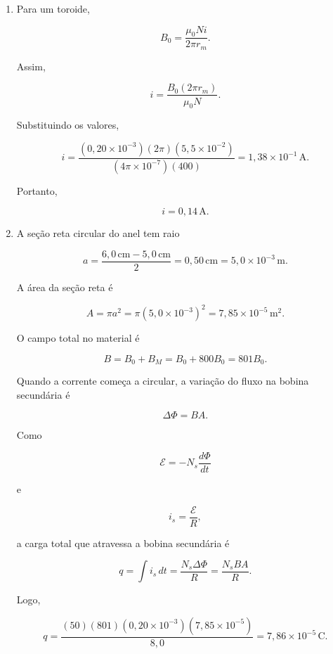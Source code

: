 \begin{enumerate}
    \item[(a)] Para um toroide,

    \[
    B_0=\frac{\mu_0Ni}{2\pi r_m}.
    \]

    Assim,

    \[
    i=\frac{B_0(2\pi r_m)}{\mu_0N}.
    \]

    Substituindo os valores,

    \[
    i=
    \frac{(0{,}20\times 10^{-3})(2\pi)(5{,}5\times 10^{-2})}
    {(4\pi\times 10^{-7})(400)}
    =
    1{,}38\times 10^{-1}\,\text{A}.
    \]

    Portanto,

    \[
    i=0{,}14\,\text{A}.
    \]

    \item[(b)] A seção reta circular do anel tem raio

    \[
    a=\frac{6{,}0\,\text{cm}-5{,}0\,\text{cm}}{2}
    =0{,}50\,\text{cm}
    =5{,}0\times 10^{-3}\,\text{m}.
    \]

    A área da seção reta é

    \[
    A=\pi a^2
    =\pi(5{,}0\times 10^{-3})^2
    =7{,}85\times 10^{-5}\,\text{m}^2.
    \]

    O campo total no material é

    \[
    B=B_0+B_M=B_0+800B_0=801B_0.
    \]

    Quando a corrente começa a circular, a variação do fluxo na bobina
    secundária é

    \[
    \Delta \Phi=B A.
    \]

    Como

    \[
    \mathcal{E}=-N_s\frac{d\Phi}{dt}
    \]

    e

    \[
    i_s=\frac{\mathcal{E}}{R},
    \]

    a carga total que atravessa a bobina secundária é

    \[
    q=\int i_s\,dt
    =
    \frac{N_s\Delta\Phi}{R}
    =
    \frac{N_sBA}{R}.
    \]

    Logo,

    \[
    q=
    \frac{(50)(801)(0{,}20\times 10^{-3})(7{,}85\times 10^{-5})}{8{,}0}
    =
    7{,}86\times 10^{-5}\,\text{C}.
    \]
\end{enumerate}

\vspace{1cm}
